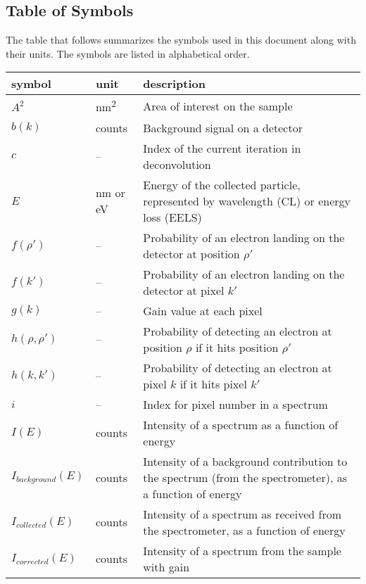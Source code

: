 \documentclass[12pt]{article}
\begin{document}

\subsection{Table of Symbols}
\label{TableSymbols}

The table that follows summarizes the symbols used in this document along with
their units. The symbols are listed in alphabetical order.

\renewcommand{\arraystretch}{1.2}
\noindent \begin{longtable*}{l l p{12cm}} \toprule
\textbf{symbol} & \textbf{unit} & \textbf{description}\\
\midrule 
$A^2$ & \si{\nano\metre^2} & Area of interest on the sample\\
$b(k)$ & counts & Background signal on a detector\\
$c$ & -- & Index of the current iteration in deconvolution \\
$E$ & \si{\nano\metre} or \si{\electronvolt} & Energy of the collected particle,
represented by wavelength (CL) or energy loss (EELS)\\
$f(\rho')$ & -- & Probability of an electron landing on the detector at position
$\rho'$\\
$f(k')$ & -- & Probability of an electron landing on the detector at pixel
$k'$\\
$g(k)$ & -- & Gain value at each pixel\\
$h(\rho, \rho')$ & -- & Probability of detecting an electron at position $\rho$
if it hits position $\rho'$\\
$h(k, k')$ & -- & Probability of detecting an electron at pixel $k$ if it hits
pixel $k'$\\
$i$ & -- & Index for pixel number in a spectrum\\
$I(E)$ & counts & Intensity of a spectrum as a function of energy\\
$I_{background}(E)$ & counts & Intensity of a background contribution to the
spectrum (from the spectrometer), as a function of energy\\
$I_{collected}(E)$ & counts & Intensity of a spectrum as received from the
spectrometer, as a function of energy\\
$I_{corrected}(E)$ & counts & Intensity of a spectrum from the sample with gain

\end{longtable*}
\end{document}

